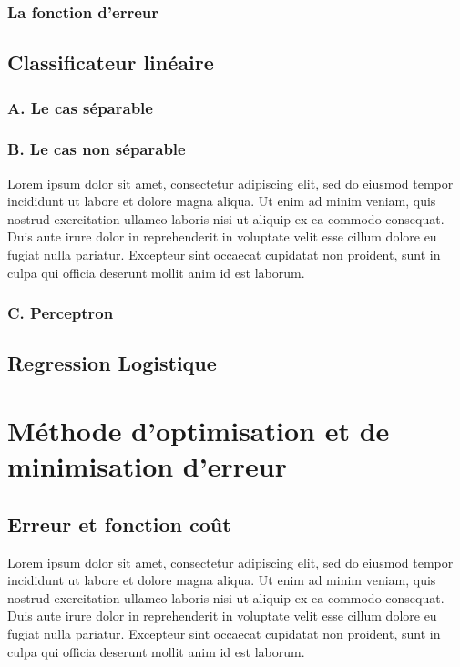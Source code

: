 	\subsubsection{La fonction d'erreur}
	
	
	\subsection{Classificateur linéaire}
	\subsubsection[A]{A. Le cas séparable }
	\subsubsection[B]{B. Le cas non séparable }
		Lorem ipsum dolor sit amet, consectetur adipiscing elit, sed do eiusmod tempor incididunt ut labore et dolore magna aliqua. Ut enim ad minim veniam, quis nostrud exercitation ullamco laboris nisi ut aliquip ex ea commodo consequat. Duis aute irure dolor in reprehenderit in voluptate velit esse cillum dolore eu fugiat nulla pariatur. Excepteur sint occaecat cupidatat non proident, sunt in culpa qui officia deserunt mollit anim id est laborum.
	\subsubsection{C. Perceptron}
	\subsection{Regression Logistique}
		
		
		
	\section{Méthode d'optimisation et de minimisation d'erreur}
	\subsection{Erreur et fonction coût}
		Lorem ipsum dolor sit amet, consectetur adipiscing elit, sed do eiusmod tempor incididunt ut labore et dolore magna aliqua. Ut enim ad minim veniam, quis nostrud exercitation ullamco laboris nisi ut aliquip ex ea commodo consequat. Duis aute irure dolor in reprehenderit in voluptate velit esse cillum dolore eu fugiat nulla pariatur. Excepteur sint occaecat cupidatat non proident, sunt in culpa qui officia deserunt mollit anim id est laborum.
			
